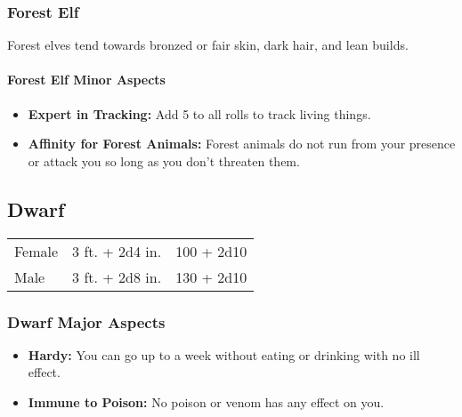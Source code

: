 \begin{multicols}{2}
\subsubsection{Forest Elf}

Forest elves tend towards bronzed or fair skin, dark hair, and lean builds.

\paragraph{Forest Elf Minor Aspects}

\begin{itemize}
    \item \textbf{Expert in Tracking:} Add 5 to all rolls to track living things.
    \item \textbf{Affinity for Forest Animals:} Forest animals do not run from your presence or attack you so long as you don't threaten them.
\end{itemize}

\subsection{Dwarf}

\begin{center}
\begin{xtabular}{|l|l|l|}
Female & 3 ft. + 2d4 in. & 100 + 2d10 \\
Male & 3 ft. + 2d8 in. & 130 + 2d10 \\
\hline
\end{xtabular}
\end{center}

\subsubsection{Dwarf Major Aspects}

\begin{itemize}
    \item \textbf{Hardy:} You can go up to a week without eating or drinking with no ill effect.
    \item \textbf{Immune to Poison:} No poison or venom has any effect on you.
\end{itemize}


\end{multicols}
